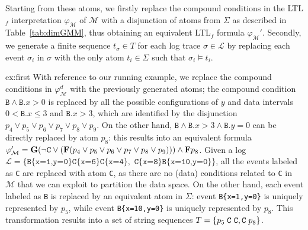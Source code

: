 Starting from these atoms, we firstly replace the compound conditions in the LTL$_f$ interpretation $\varphi_{\mathcal{M}}$ of $\mathcal{M}$ with a disjunction of atoms from $\Sigma$ as described in Table~\ref{tab:dimGMM}, thus obtaining an equivalent LTL$_f$ formula $\varphi_{\mathcal{M}}'$. Secondly, we generate a finite sequence $t_\sigma\in T$ for each log trace $\sigma\in\mathcal{L}$ by replacing each event $\sigma_i$ in $\sigma$ with the only atom $t_i\in \Sigma$ such that $\sigma_i\vDash t_i$.
%

\begin{continueexample}{ex:first}
With reference to our running example, we replace the compound conditions in $\varphi_{\mathcal{M}}^d$ with the previously generated atoms; the compound condition $\texttt{B}\wedge \texttt{B}.x>0$ is replaced by all the possible configurations of $y$ and data intervals $0<\texttt{B}.x\leq 3$ and $\texttt{B}.x>3$, which are identified by the disjunction $p_4\vee p_5\vee p_6\vee p_7\vee p_8\vee p_9$. On the other hand, $\texttt{B}\wedge\texttt{B}.x>3\wedge \texttt{B}.y=0$ can be directly replaced by atom $p_8$: this results into an equivalent formula $\varphi_{\mathcal{M}}'=\mathbf{G}(\neg\texttt{C}\vee(\mathbf{F}(p_4\vee p_5\vee p_6\vee p_7\vee p_8\vee p_9)))\wedge \mathbf{F} p_8$.
Given a log $\mathcal{L}=\{\texttt{B\{x=1,y=0\}C\{x=6\}C\{x=4\}},
\texttt{ C\{x=8\}B\{x=10,y=0\}}\}$,
all the events labeled as \texttt{C} are replaced with atom \texttt{C}, as there are no (data) conditions related to \texttt{C} in $\mathcal{M}$ that we can exploit to partition the data space. On the other hand, each event labeled as \texttt{B} is replaced by an equivalent atom in $\Sigma$: event \texttt{B\{x=1,y=0\}} is uniquely represented by $p_5$, while event \texttt{B\{x=10,y=0\}} is uniquely represented by $p_8$. %
This transformation results into a set of string sequences $T=\{{ p_5\;\texttt{C\;C}}, \texttt{C}\;p_8\}$.
\end{continueexample}


